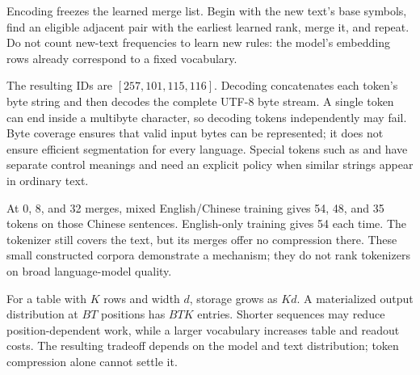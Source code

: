Encoding freezes the learned merge list. Begin with the new text's base
symbols, find an eligible adjacent pair with the earliest learned rank,
merge it, and repeat. Do not count new-text frequencies to learn new rules:
the model's embedding rows already correspond to a fixed vocabulary.


The resulting IDs are $[257,101,115,116]$. Decoding concatenates each
token's byte string and then decodes the complete UTF-8 byte stream.
A single token can end inside a multibyte character, so decoding tokens
independently may fail. Byte coverage ensures that valid input bytes can be
represented; it does not ensure efficient segmentation for every language.
Special tokens such as \BOS{} and \EOS{} have separate control meanings
and need an explicit policy when similar strings appear in ordinary text.


At 0, 8, and 32 merges, mixed English/Chinese training gives 54, 48, and 35
tokens on those Chinese sentences. English-only training gives 54 each time.
The tokenizer still covers the text, but its merges offer no compression there.
These small constructed corpora demonstrate a mechanism; they do not rank
tokenizers on broad language-model quality.

For a table with $K$ rows and width $d$, storage grows as $Kd$. A materialized
output distribution at $BT$ positions has $BTK$ entries. Shorter sequences
may reduce position-dependent work, while a larger vocabulary increases
table and readout costs. The resulting tradeoff depends on the model and
text distribution; token compression alone cannot settle it.

